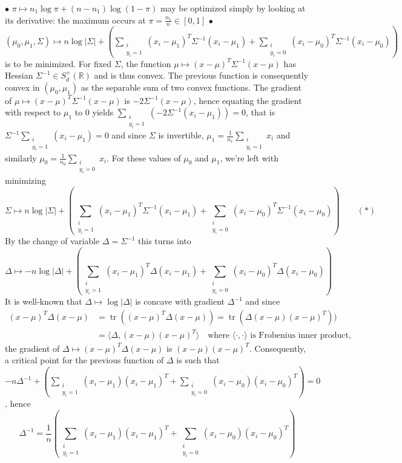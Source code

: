 \documentclass[a4paper,11pt]{article}
\DeclareMathOperator*{\tr}{tr}
\begin{document}
\noindent$\bullet$ $\pi \mapsto n_1\log \pi +(n-n_1)\log(1-\pi)$ may be optimized simply by looking at its derivative: the maximum occurs at $\pi = \frac{n_1}n\in [0,1]$ \newline
$\bullet$ $\displaystyle (\mu_0,\mu_1,\Sigma)\mapsto n \log |\Sigma| + \left( \sum_{\substack{i\\y_i=1}}(x_i-\mu_1)^T\Sigma^{-1}(x_i-\mu_1) + \sum_{\substack{i\\y_i=0}}(x_i-\mu_0)^T\Sigma^{-1}(x_i-\mu_0)\right)$ is to be minimized. For fixed $\Sigma$, the function $\mu\mapsto (x-\mu)^T\Sigma^{-1}(x-\mu)$ has Hessian $\Sigma^{-1} \in S_d^{+}(\mathbb R)$ and is thus convex. The previous function is consequently convex in $(\mu_0,\mu_1)$ as the separable sum of two convex functions. The gradient of $\mu\mapsto (x-\mu)^T\Sigma^{-1}(x-\mu)$ is $-2\Sigma^{-1}(x-\mu)$, hence equating the gradient with respect to $\mu_1$ to $0$ yields $\displaystyle \sum_{\substack{i\\y_i=1}} (-2\Sigma^{-1}(x_i-\mu_1)) = 0$, that is $\displaystyle \Sigma^{-1}\sum_{\substack{i\\y_i=1}} (x_i-\mu_1)=0$ and since $\Sigma$ is invertible, $\displaystyle \boxed{\mu_1 = \frac{1}{n_1}\sum_{\substack{i\\y_i=1}} x_i}$ and similarly $\displaystyle \boxed{\mu_0 = \frac{1}{n_0}\sum_{\substack{i\\y_i=0}} x_i}$. \newline
For these values of $\mu_0$ and $\mu_1$, we're left with minimizing $$\displaystyle \Sigma\mapsto n \log |\Sigma| + \left( \sum_{\substack{i\\y_i=1}}(x_i-\mu_1)^T\Sigma^{-1}(x_i-\mu_1) + \sum_{\substack{i\\y_i=0}}(x_i-\mu_0)^T\Sigma^{-1}(x_i-\mu_0)\right)\quad \quad (*)$$ By the change of variable $\Delta = \Sigma^{-1}$ this turns into $$\displaystyle \Delta\mapsto -n \log |\Delta| + \left( \sum_{\substack{i\\y_i=1}}(x_i-\mu_1)^T\Delta(x_i-\mu_1) + \sum_{\substack{i\\y_i=0}}(x_i-\mu_0)^T\Delta(x_i-\mu_0)\right)$$
It is well-known that $\Delta\mapsto \log|\Delta|$ is concave with gradient $\Delta^{-1}$ and since $$\begin{aligned}
  (x-\mu)^T\Delta(x-\mu) &= \tr ((x-\mu)^T\Delta(x-\mu)) = \tr(\Delta(x-\mu)(x-\mu)^T))\\
  &= \langle \Delta,(x-\mu)(x-\mu)^T \rangle \quad \text{where } \langle \cdot,\cdot \rangle \text{ is Frobenius inner product,}
\end{aligned}$$ the gradient of $\Delta \mapsto (x-\mu)^T\Delta(x-\mu)$ is $(x-\mu)(x-\mu)^T$. Consequently, a critical point for the previous function of $\Delta$ is such that $\displaystyle -n\Delta^{-1} + \left( \sum_{\substack{i\\y_i=1}}(x_i-\mu_1)(x_i-\mu_1)^T + \sum_{\substack{i\\y_i=0}}(x_i-\mu_0)(x_i-\mu_0)^T\right)=0$, hence $$\Delta^{-1} = \frac 1n\left( \sum_{\substack{i\\y_i=1}}(x_i-\mu_1)(x_i-\mu_1)^T + \sum_{\substack{i\\y_i=0}}(x_i-\mu_0)(x_i-\mu_0)^T\right)$$
\end{document}
